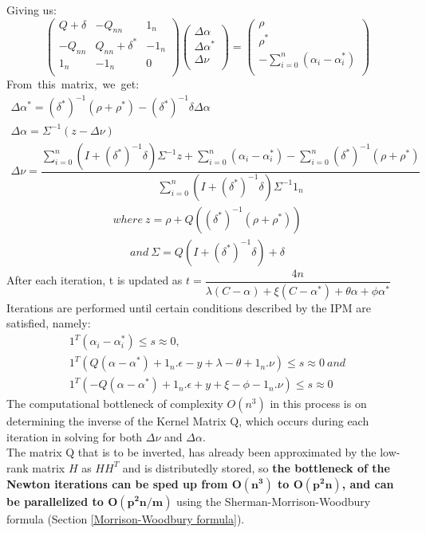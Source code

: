 \documentclass[12pt]{article}
\begin{document}
 Giving us:
 \[
\begin{pmatrix} 
Q+\delta&-Q_{nn}&1_{n}\\
-Q_{nn}&Q_{nn} + \delta^*&-1_{n}\\
1_{n}&-1_{n}&0\\
\end{pmatrix}
\begin{pmatrix} 
\Delta \alpha\\
\Delta \alpha^*\\
\Delta\nu\\
\end{pmatrix}
=
\begin{pmatrix} 
\rho\\
\rho^*\\
-\sum_{i=0}^{n}{(\alpha_{i} - \alpha_{i}^*)}\\
\end{pmatrix}
\]
\belowdisplayskip=0pt
From\ this\ matrix,\ we\ get:\\
 \begin{gather}
\Delta\alpha^*=(\delta^*)^{-1}(\rho + \rho^*) - (\delta^*)^{-1}\delta\Delta\alpha\\
\Delta\alpha=\Sigma^{-1}(z - \Delta\nu)\\
\Delta\nu = \dfrac{\sum_{i=0}^{n}{(I+(\delta^*)^{-1}\delta)\Sigma^{-1}z} + \sum_{i=0}^{n}{(\alpha_{i} - \alpha_{i}^*)} - \sum_{i=0}^{n}{(\delta^*)^{-1}(\rho+\rho^*)}}{\sum_{i=0}^{n}{(I+(\delta^*)^{-1}\delta)\Sigma^{-1}1_{n}}}
\end{gather}
\begin{gather*}
where\ z = \rho + Q((\delta^*)^{-1}(\rho + \rho^*))
\end{gather*}
\begin{gather}
and\ \Sigma={Q(I+(\delta^*)^{-1}\delta) + \delta}
 \end{gather}
 \belowdisplayskip=5pt
 After each iteration, t is updated as $t=\dfrac{4n}{\lambda(C-\alpha) + \xi(C-\alpha^*) + \theta\alpha + \phi\alpha^*}$
\newline\newline
Iterations are performed until certain conditions described by the IPM are satisfied, namely:
  \begin{gather*}
1^T(\alpha_{i} - \alpha_{i}^*) \leq s \approx 0, \\
1^T(Q(\alpha - \alpha^*) + 1_{n}.\epsilon - y + \lambda - \theta + 1_{n}.\nu) \leq s \approx 0\ and \\
1^T( -Q(\alpha - \alpha^*) + 1_{n}.\epsilon + y + \xi - \phi - 1_{n}.\nu) \leq s \approx 0
 \end{gather*}
 The computational bottleneck of complexity $O(n^3)$ in this process is on determining the inverse of the Kernel Matrix Q, which occurs during each iteration in solving for both $\Delta \nu$ and $\Delta \alpha$. \\
The matrix Q that is to be inverted, has already been approximated by the low-rank matrix $H$ as $HH^T$ and is distributedly stored, so  {\bf  the bottleneck of the Newton iterations can be sped up from $\bm{O(n^3)}$ to $\bm{O(p^2n)}$, and can be parallelized to $\bm{O(p^2n/m)}$} using the Sherman-Morrison-Woodbury formula (Section \ref{Morrison-Woodbury formula}).
\end{document}
